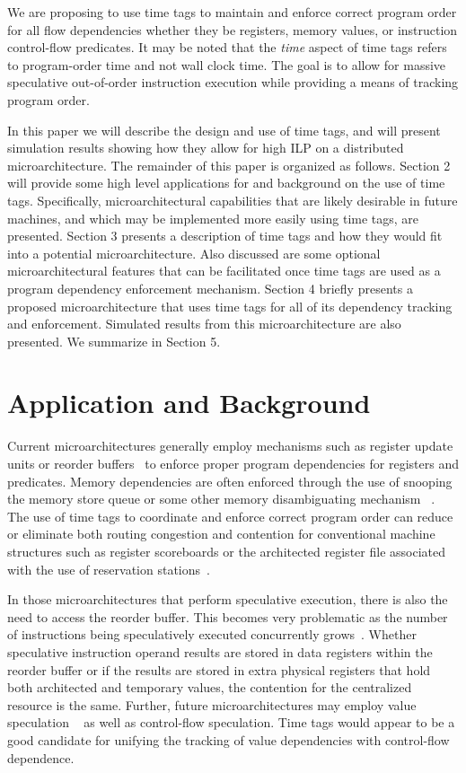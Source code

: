 \documentclass[10pt,twocolumn]{article}
\begin{document}
We are proposing to use time tags to maintain 
and enforce correct program order for all flow dependencies whether
they be registers, memory values, or instruction control-flow predicates.
It may be noted that the \textit{time} aspect of time tags
refers to program-order time and not wall clock time.
The goal is to allow for massive speculative out-of-order 
instruction execution while
providing a means of tracking program order.
 
In this paper we will describe the design and use of time tags, and 
will present simulation results showing how they allow for high ILP
on a distributed microarchitecture.  
The remainder of this paper is organized
as follows.
Section 2 will provide some high level applications for and background on
the use of time tags.  Specifically, microarchitectural capabilities
that are likely desirable in future machines, and which may be implemented 
more easily using time tags, are presented.
Section 3 presents a description of time tags and how they would
fit into a potential microarchitecture.  
Also discussed are
some optional microarchitectural features
that can be facilitated once time tags are used as
a program dependency enforcement mechanism.
Section 4 briefly presents a proposed microarchitecture
that uses time tags for all of its dependency tracking and enforcement.
Simulated results from this microarchitecture are also presented.
We summarize in Section 5.
%
%
\vspace{-0.25in}
\section{Application and Background}
\vspace{-0.15in}
%
Current microarchitectures generally employ mechanisms such as
register update units or reorder buffers~\cite{Bannon95,Kessler98,Smith95}
to enforce
proper program dependencies for registers and predicates.
Memory dependencies are often enforced through the use of
snooping the memory store queue or some other memory disambiguating
mechanism ~\cite{Sohi96}.
The use of time tags to coordinate and enforce correct program
order can reduce or eliminate both routing congestion and
contention for conventional machine structures such as
register scoreboards \cite{Thornton64} 
or the architected register file associated
with the use of reservation stations~\cite{Anderson67}.

In those microarchitectures
that perform speculative execution, there is also
the need to access the reorder buffer.  This becomes very problematic
as the number of instructions being speculatively executed concurrently
grows~\cite{Palacharla97}.  
Whether speculative instruction operand
results are stored in data registers within the reorder buffer or if the
results are stored in extra physical registers that hold both architected
and temporary values, the contention for the centralized resource is
the same.
Further, future microarchitectures may employ value speculation
~\cite{gonzalez98limits,lipasti96exceeding,lipasti97performance}
as well as control-flow speculation.
Time tags would appear to be a good candidate for unifying
the tracking of value dependencies with control-flow
dependence.
\end{document}
